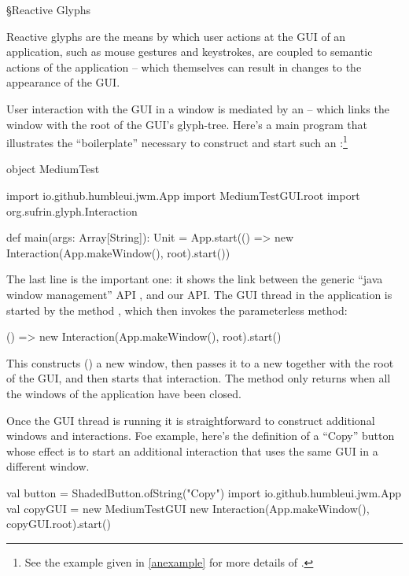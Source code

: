 \S{Reactive Glyphs}

Reactive glyphs are the means by which user actions at the GUI of an
application, such as mouse gestures and keystrokes, are coupled to
semantic actions of the application -- which themselves can result in
changes to the appearance of the GUI.

User interaction with the GUI in a window is mediated by an  -- which
links the window with the root of the GUI's glyph-tree. Here's a main
program that illustrates the  ``boilerplate'' necessary to construct and
start such an :\footnote{See the example given in
\ref{anexample} for more details of  .}


\begin{scala}
object MediumTest {
  import io.github.humbleui.jwm.App
  import MediumTestGUI.root
  import org.sufrin.glyph.Interaction

  def main(args: Array[String]): Unit = 
    App.start(() => new Interaction(App.makeWindow(), root).start()) 
}
\end{scala}

The last line is the important one: it shows the link between the
generic ``java window management'' API
, and our  API.
The GUI thread in the application is started by the method
, which then invokes the parameterless method:

\begin{scala}
    () => new Interaction(App.makeWindow(), root).start() 
\end{scala}

This constructs () a new window, then passes it
to a new  together with the root of the GUI, and then
starts that interaction. The method  only
returns when all the windows of the application have been closed.

Once the GUI thread is running it is straightforward to construct
additional windows and interactions. Foe example, here's the
definition of a ``Copy'' button whose effect is to start an
additional interaction that uses the same GUI in a different window.


\begin{scala}
  val button = ShadedButton.ofString("Copy") {
    import io.github.humbleui.jwm.App
    val copyGUI = new MediumTestGUI {}
    new Interaction(App.makeWindow(), copyGUI.root).start()
  }
\end{scala}


